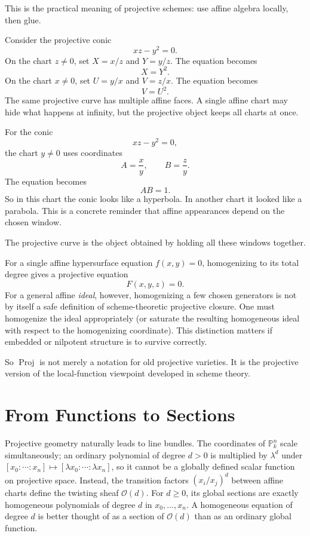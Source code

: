 This is the practical meaning of projective schemes: use affine algebra locally, then glue.

Consider the projective conic
\[
  xz-y^2=0.
\]
On the chart \(z\ne0\), set \(X=x/z\) and \(Y=y/z\). The equation becomes
\[
  X=Y^2.
\]
On the chart \(x\ne0\), set \(U=y/x\) and \(V=z/x\). The equation becomes
\[
  V=U^2.
\]
The same projective curve has multiple affine faces. A single affine chart may hide what happens at infinity, but the projective object keeps all charts at once.

For the conic
\[
  xz-y^2=0,
\]
the chart \(y\ne0\) uses coordinates
\[
  A=\frac{x}{y},
  \qquad
  B=\frac{z}{y}.
\]
The equation becomes
\[
  AB=1.
\]
So in this chart the conic looks like a hyperbola.  In another chart it looked like a parabola.  This is a concrete reminder that affine appearances depend on the chosen window.

The projective curve is the object obtained by holding all these windows together.

For a single affine hypersurface equation \(f(x,y)=0\), homogenizing to its total degree gives a projective equation
\[
  F(x,y,z)=0.
\]
For a general affine \emph{ideal}, however, homogenizing a few chosen generators is not by itself a safe definition of scheme-theoretic projective closure. One must homogenize the ideal appropriately (or saturate the resulting homogeneous ideal with respect to the homogenizing coordinate). This distinction matters if embedded or nilpotent structure is to survive correctly.

So \(\operatorname{Proj}\) is not merely a notation for old projective varieties. It is the projective version of the local-function viewpoint developed in scheme theory.

\section{From Functions to Sections}

Projective geometry naturally leads to line bundles. The coordinates of \(\mathbb P^n_k\) scale simultaneously; an ordinary polynomial of degree \(d>0\) is multiplied by \(\lambda^d\) under \([x_0:\cdots:x_n]\mapsto[\lambda x_0:\cdots:\lambda x_n]\), so it cannot be a globally defined scalar function on projective space. Instead, the transition factors \((x_i/x_j)^d\) between affine charts define the twisting sheaf \(\mathcal O(d)\). For \(d\ge0\), its global sections are exactly homogeneous polynomials of degree \(d\) in \(x_0,\ldots,x_n\).  A homogeneous equation of degree \(d\) is better thought of as a section of \(\mathcal O(d)\) than as an ordinary global function.

